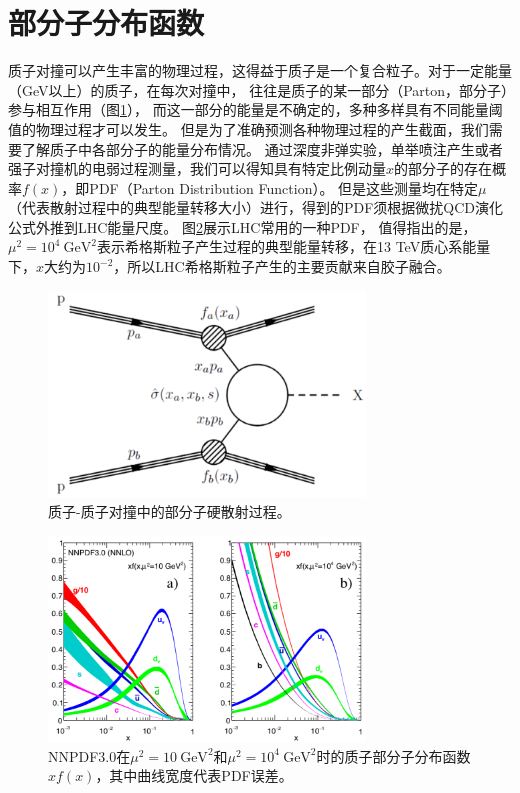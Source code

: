 
\section{部分子分布函数}
质子对撞可以产生丰富的物理过程，这得益于质子是一个复合粒子。对于一定能量（GeV以上）的质子，在每次对撞中，
往往是质子的某一部分（Parton，部分子）参与相互作用（图\ref{fig:pp_collision}），
而这一部分的能量是不确定的，多种多样具有不同能量阈值的物理过程才可以发生。
但是为了准确预测各种物理过程的产生截面，我们需要了解质子中各部分子的能量分布情况。
通过深度非弹实验\cite{Kuhlen:390284}，单举喷注产生\cite{Aad2015-pdf}或者强子对撞机的电弱过程测量\cite{Khachatryan2016,Khachatryan2015}，我们可以得知具有特定比例动量$x$的部分子的存在概率$f(x)$，即PDF（Parton Distribution Function）。
但是这些测量均在特定$\mu$（代表散射过程中的典型能量转移大小）进行，得到的PDF须根据微扰QCD演化公式\cite{ellis_stirling_webber_1996}外推到LHC能量尺度。
图\ref{fig:NNPDF3}展示LHC常用的一种PDF，
值得指出的是，$\mu^2=10^4~\text{GeV}^2$表示希格斯粒子产生过程的典型能量转移，在13 TeV质心系能量下，$x$大约为$10^{-2}$，所以LHC希格斯粒子产生的主要贡献来自胶子融合。
\begin{figure}[h]
\centering
 \includegraphics[width=0.75\textwidth]{fig/inclusive_pp.png}
 \caption{质子-质子对撞中的部分子硬散射过程。}
 \label{fig:pp_collision}
\end{figure}
\begin{figure}[h]
\centering
 \includegraphics[width=0.75\textwidth]{fig/NNPDF3.png}
 \caption{NNPDF3.0\cite{Patrignani:2016xqp}在$\mu^2=10~\text{GeV}^2$和$\mu^2=10^4~\text{GeV}^2$时的质子部分子分布函数$xf(x)$，其中曲线宽度代表PDF误差。}
 \label{fig:NNPDF3}
\end{figure}
